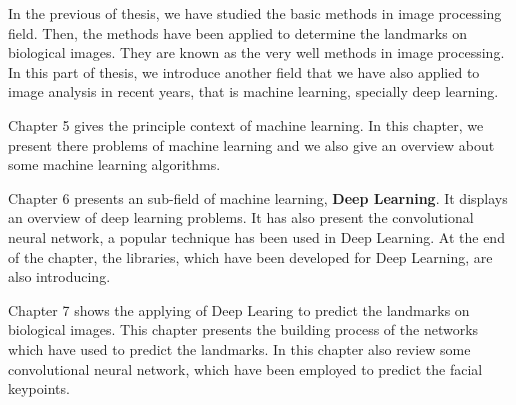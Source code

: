 In the previous of thesis, we have studied the basic methods in image processing field. Then, the methods have been applied to determine the landmarks on biological images. They are known as the very well methods in image processing. In this part of thesis, we introduce another field that we have also applied to image analysis in recent years, that is machine learning, specially deep learning. 


Chapter 5 gives the principle context of machine learning. In this chapter, we present there problems of machine learning and we also give an overview about some machine learning algorithms.


Chapter 6 presents an sub-field of machine learning, \textbf{Deep Learning}. It displays an overview of deep learning problems. It has also present the convolutional neural network, a popular technique has been used in Deep Learning. At the end of the chapter, the libraries, which have been developed for Deep Learning, are also introducing.


Chapter 7 shows the applying of Deep Learing to predict the landmarks on biological images. This chapter presents the building process of the networks which have used to predict the landmarks. In this chapter also review some convolutional neural network, which have been employed to predict the facial keypoints.